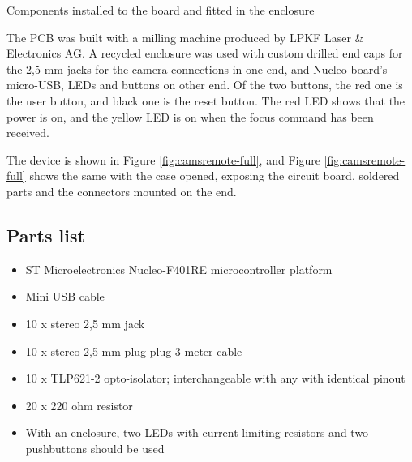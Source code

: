 {Components installed to the board and fitted in the enclosure}

The PCB was built with a milling machine produced by LPKF Laser \& Electronics AG.
A recycled enclosure was used with custom drilled end caps for the 2,5 mm jacks for the camera connections in one end, and Nucleo board's micro-USB, LEDs and buttons on other end.
Of the two buttons, the red one is the user button, and black one is the reset button.
The red LED shows that the power is on, and the yellow LED is on when the focus command has been received.

The device is shown in Figure \ref{fig:camsremote-full}, and Figure \ref{fig:camsremote-full} shows the same with the case opened, exposing the circuit board, soldered parts and the connectors mounted on the end.



\subsection{Parts list}

\begin{itemize}
	\item ST Microelectronics Nucleo-F401RE microcontroller platform
	\item Mini USB cable
	\item 10 x stereo 2,5 mm jack
	\item 10 x stereo 2,5 mm plug-plug 3 meter cable
	\item 10 x TLP621-2 opto-isolator; interchangeable with any with identical pinout
	\item 20 x 220 ohm resistor
	\item With an enclosure, two LEDs with current limiting resistors and two pushbuttons should be used
\end{itemize}
